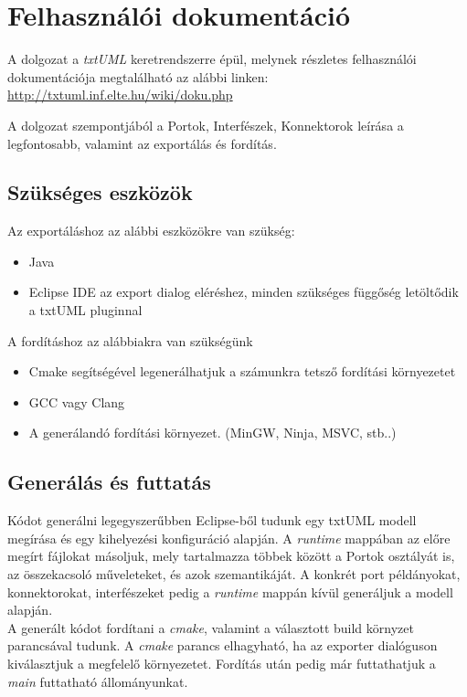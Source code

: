 \documentclass[a4paper,12pt]{report}
\begin{document}
\section{Felhasználói dokumentáció}
A dolgozat a \textit{txtUML} keretrendszerre épül, melynek részletes felhasználói dokumentációja megtalálható az alábbi linken: \url{http://txtuml.inf.elte.hu/wiki/doku.php}

A dolgozat szempontjából a Portok, Interfészek, Konnektorok leírása a legfontosabb, valamint az exportálás és fordítás.

\subsection{Szükséges eszközök}
Az exportáláshoz az alábbi eszközökre van szükség:
\begin{itemize}
\item Java
\item Eclipse IDE az export dialog eléréshez, minden szükséges függőség letöltődik a txtUML pluginnal
\end{itemize}

A fordításhoz az alábbiakra van szükségünk
\begin{itemize}
\item Cmake segítségével legenerálhatjuk a számunkra tetsző fordítási környezetet
\item GCC vagy Clang
\item A generálandó fordítási környezet. (MinGW, Ninja, MSVC, stb..)
\end{itemize}

\subsection{Generálás és futtatás}
Kódot generálni legegyszerűbben Eclipse-ből tudunk egy txtUML modell megírása és egy kihelyezési konfiguráció alapján. A \textit{runtime} mappában az előre megírt fájlokat másoljuk, mely tartalmazza többek között a Portok osztályát is, az összekacsoló műveleteket, és azok szemantikáját. A konkrét port példányokat, konnektorokat, interfészeket pedig a \textit{runtime} mappán kívül generáljuk a modell alapján. \\

A generált kódot fordítani a \textit{cmake}, valamint a választott build környzet parancsával tudunk. A \textit{cmake} parancs elhagyható, ha az exporter dialóguson kiválasztjuk a megfelelő környezetet. Fordítás után pedig már futtathatjuk a \textit{main} futtatható állományunkat.
\end{document}
